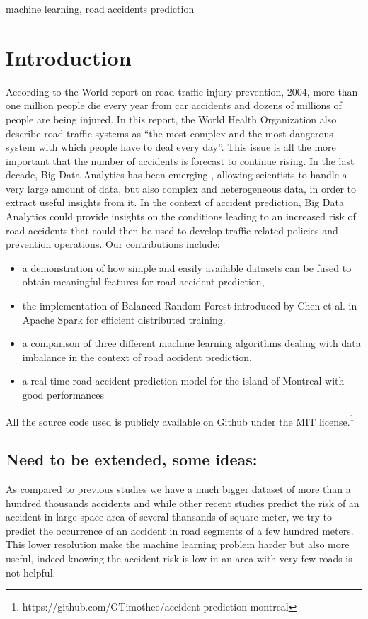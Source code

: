 \documentclass[conference]{IEEEtran}
\begin{document}
\begin{IEEEkeywords}
machine learning, road accidents prediction
\end{IEEEkeywords}

\section{Introduction}
According to the World report on road traffic injury prevention, 2004, more than one million people die every year from car accidents and dozens of millions of people are being injured\cite{Peden2004}.
In this report, the World Health Organization also describe road traffic systems as “the most complex and the most dangerous system with which people have to deal every day”.
This issue is all the more important that the number of accidents is forecast to continue rising.
In the last decade, Big Data Analytics has been emerging \cite{Gandomi2015}, allowing scientists to handle a very large amount of data, but also complex and heterogeneous data, in order to extract useful insights from it.
In the context of accident prediction, Big Data Analytics could provide insights on the conditions leading to an increased risk of road accidents that could then be used to develop traffic-related policies and prevention operations.
Our contributions include: 
\begin{itemize}
\item a demonstration of how simple and easily available datasets can be fused to obtain meaningful features for road accident prediction,
\item the implementation of Balanced Random Forest introduced by Chen et al.\cite{Chen2004} in Apache Spark for efficient distributed training.
\item a comparison of three different machine learning algorithms dealing with data imbalance in the context of road accident prediction,
\item a real-time road accident prediction model for the island of Montreal with good performances
\end{itemize}
All the source code used is publicly available on Github under the MIT license.\footnote{https://github.com/GTimothee/accident-prediction-montreal}

\subsection{Need to be extended, some ideas:}

  As compared to previous studies we have a much bigger dataset of more than a hundred thousands accidents and while other recent studies predict the risk  of an accident in large space area of several thansands of square meter, we try to predict the occurrence of an accident in road segments of a few hundred meters. This lower resolution make the machine learning problem harder but also more useful, indeed knowing the accident risk is low in an area with very few roads is not helpful. 
\end{document}
